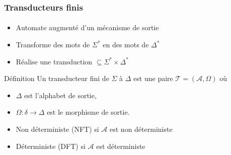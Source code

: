\frametitle{Transducteurs finis}
\framesubtitle{}

\begin{itemize}
	\item Automate augmenté d'un mécanisme de sortie
	\item Transforme des mots de $\Sigma^*$ en des mots de $\Delta^*$
	\item Réalise une transduction $\subseteq \Sigma^* \times \Delta^*$
\end{itemize}

\begin{block}{Définition}
	Un transducteur fini de $\Sigma$ à $\Delta$ est une paire $\mathscr{T} = (\mathscr{A}, \Omega)$ où
	
	\begin{itemize}
		\item $\Delta$ est l'alphabet de sortie,
		\item $\Omega : \delta \to \Delta$ est le morphisme de sortie.

	\end{itemize}
\end{block}

\begin{itemize}
	\item Non déterministe (NFT) si $\mathscr{A}$ est non déterministe
	\item Déterministe (DFT) si $\mathscr{A}$ est déterministe
\end{itemize}

